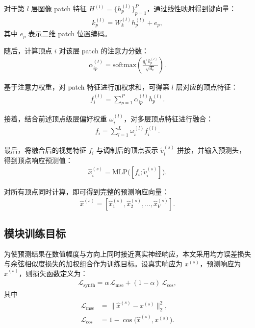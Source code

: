 对于第 $l$ 层图像 patch 特征 $H^{(l)} = \{h_p^{(l)}\}_{p=1}^{P}$，通过线性映射得到键向量：
\begin{align}
  k_p^{(l)} = W_k^{(l)} h_p^{(l)} + e_p,
\end{align}
其中 $e_p$ 表示二维 patch 位置编码。

随后，计算顶点 $i$ 对该层 patch 的注意力分数：
\begin{align}
  \alpha_{ip}^{(l)} = \mathrm{softmax}\!\left(\frac{q_i^{\top} k_p^{(l)}}{\sqrt{d_v}}\right).
\end{align}

基于注意力权重，对 patch 特征进行加权求和，可得第 $l$ 层对应的顶点特征：
\begin{align}
  f_i^{(l)} = \sum_{p=1}^{P} \alpha_{ip}^{(l)} h_p^{(l)}.
\end{align}

接着，结合前述顶点级层偏好权重 $\omega_i^{(l)}$，对多层顶点特征进行融合：
\begin{align}
  f_i = \sum_{l=1}^{L} \omega_i^{(l)} f_i^{(l)}.
\end{align}

最后，将融合后的视觉特征 $f_i$ 与调制后的顶点表示 $\tilde{v}_i^{(s)}$ 拼接，并输入预测头，得到顶点响应预测值：
\begin{align}
  \hat{x}_i^{(s)} = \mathrm{MLP}\bigl([f_i; \tilde{v}_i^{(s)}]\bigr).
\end{align}

对所有顶点同时计算，即可得到完整的预测响应向量：
\begin{align}
  \hat{x}^{(s)} = [\hat{x}_1^{(s)}, \hat{x}_2^{(s)}, \dots, \hat{x}_V^{(s)}].
\end{align}

\subsection{模块训练目标}

为使预测结果在数值幅度与方向上同时接近真实神经响应，本文采用均方误差损失与余弦相似度损失的加权组合作为训练目标。设真实响应为 $x^{(s)}$，预测响应为 $\hat{x}^{(s)}$，则损失函数定义为：
\begin{align}
  \mathcal{L}_{\mathrm{synth}} = \alpha \, \mathcal{L}_{\mathrm{mse}} + (1-\alpha) \, \mathcal{L}_{\mathrm{cos}},
\end{align}
其中
\begin{align}
  \mathcal{L}_{\mathrm{mse}} &= \lVert \hat{x}^{(s)} - x^{(s)} \rVert_2^2, \\
  \mathcal{L}_{\mathrm{cos}} &= 1 - \cos\bigl(\hat{x}^{(s)}, x^{(s)}\bigr).
\end{align}


